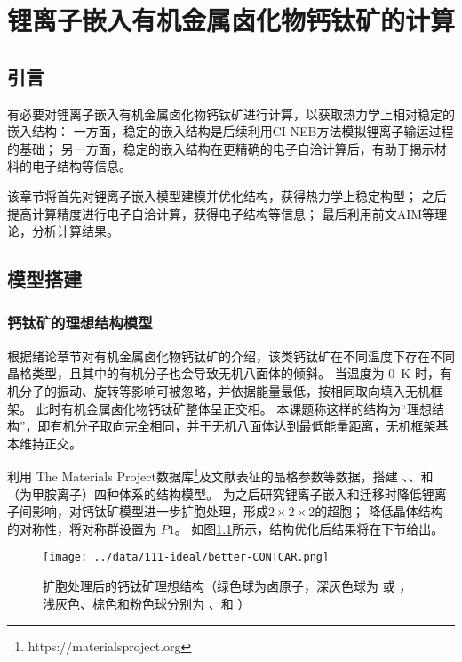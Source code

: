 \chapter{锂离子嵌入有机金属卤化物钙钛矿的计算}
\label{ch:pos}

\section{引言}

有必要对锂离子嵌入有机金属卤化物钙钛矿进行计算，以获取热力学上相对稳定的嵌入结构：
一方面，稳定的嵌入结构是后续利用CI-NEB方法模拟锂离子输运过程的基础；
另一方面，稳定的嵌入结构在更精确的电子自洽计算后，有助于揭示材料的电子结构等信息。

该章节将首先对锂离子嵌入模型建模并优化结构，获得热力学上稳定构型；
之后提高计算精度进行电子自洽计算，获得电子结构等信息；
最后利用前文AIM等理论，分析计算结果。

\section{模型搭建}

\subsection{钙钛矿的理想结构模型}

根据绪论章节对有机金属卤化物钙钛矿的介绍，该类钙钛矿在不同温度下存在不同晶格类型，且其中的有机分子也会导致无机八面体的倾斜。
当温度为 \SI{0}{K} 时，有机分子的振动、旋转等影响可被忽略，并依据能量最低，按相同取向填入无机框架。
此时有机金属卤化物钙钛矿整体呈正交相。
本课题称这样的结构为“理想结构”，即有机分子取向完全相同，并于无机八面体达到最低能量距离，无机框架基本维持正交。

利用 The Materials Project数据库\footnote{https://materialsproject.org}及文献\cite{yinMetalChloridePerovskite2020}表征的晶格参数等数据，搭建 、、和  （为甲胺离子）四种体系的结构模型。
为之后研究锂离子嵌入和迁移时降低锂离子间影响，对钙钛矿模型进一步扩胞处理，形成$2\times2\times2$的超胞；
降低晶体结构的对称性，将对称群设置为 $P1$。
如图\ref{fig:ideal-struc}所示，结构优化后结果将在下节给出。

\begin{figure}[ht]
    \centering
    \texttt{[image: ../data/111-ideal/better-CONTCAR.png]}
    \caption{扩胞处理后的钙钛矿理想结构（绿色球为卤原子，深灰色球为 或 ，浅灰色、棕色和粉色球分别为 、和 ）}
    \label{fig:ideal-struc}
\end{figure}

